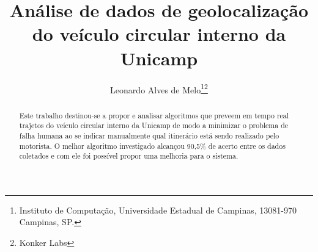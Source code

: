 \documentclass[11pt,twoside]{article}
\begin{document}
% 

%



\TRMakeCover


%
\pagestyle{myheadings}

%
\title{Análise de dados de geolocalização do veículo circular interno da Unicamp}
\author{Leonardo Alves de Melo\thanks{Instituto  de Computação, Universidade
Estadual  de Campinas, 13081-970  Campinas,  SP.}\thanks{Konker Labs}}

\date{}

\maketitle


\begin{abstract} 

Este trabalho destinou-se a propor e analisar algoritmos que preveem em tempo real trajetos do veículo circular interno da Unicamp de modo a minimizar o problema de falha humana ao se indicar manualmente qual itinerário está sendo realizado pelo motorista. O melhor algoritmo investigado alcançou 90,5\% de acerto entre os dados coletados e com ele foi possível propor uma melhoria para o sistema.

\end{abstract}
\end{document}
